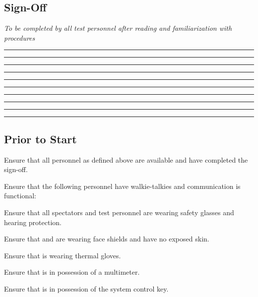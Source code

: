 \subsection{Sign-Off}
\textit{To be completed by all test personnel after reading and familiarization with procedures}
\begin{checklist}
    \item \opsfull{}      \tabto{25em}\rule{10em}{0.4pt}\hspace{5em}\rule{10em}{0.4pt}
    \item \primaryfull{}  \tabto{25em}\rule{10em}{0.4pt}\hspace{5em}\rule{10em}{0.4pt}
    \item \secondaryfull{}\tabto{25em}\rule{10em}{0.4pt}\hspace{5em}\rule{10em}{0.4pt}
    \item \daqfull{}      \tabto{25em}\rule{10em}{0.4pt}\hspace{5em}\rule{10em}{0.4pt}
    \item \controlfull{}  \tabto{25em}\rule{10em}{0.4pt}\hspace{5em}\rule{10em}{0.4pt}
\end{checklist}
\setcounter{checklistnum}{0}

\newpage
\subsection{Prior to Start}
\begin{checklist}
    \item Ensure that all personnel as defined above are available and have completed the sign-off.
    \item Ensure that the following personnel have walkie-talkies and communication is functional:
    \begin{checklist}
        \item \ops{}
        \item \secondary{}
        \item \daq{}
        \item \control{}
    \end{checklist}
    \item Ensure that all spectators and test personnel are wearing safety glasses and hearing protection.
    \item Ensure that \primary{} and \secondary{} are wearing face shields and have no exposed skin.
    \item Ensure that \primary{} is wearing thermal gloves.
    \item Ensure that \secondary{} is in possession of a multimeter.
    \item Ensure that \ops{} is in possession of the system control key.
\end{checklist}
\setcounter{checklistnum}{0}

